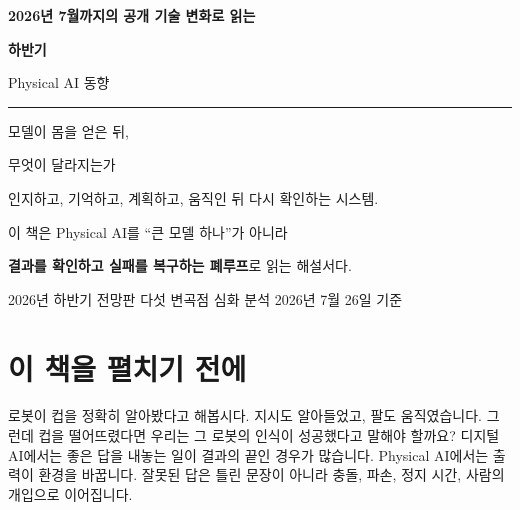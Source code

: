 \documentclass[11pt,openany]{book}
\begin{document}
\frontmatter

\begin{titlepage}
\pagecolor{deepblue}\color{white}
\thispagestyle{empty}
\vspace*{14mm}

{\sffamily\bfseries\fontsize{15}{18}\selectfont
2026년 7월까지의 공개 기술 변화로 읽는\par}
\vspace{11mm}

{\sffamily\bfseries\fontsize{32}{40} 하반기\par
Physical AI 동향\par}

\vspace{8mm}
{\color{coral}\rule{45mm}{2.5pt}}\par
\vspace{8mm}

{\sffamily\fontsize{17}{25}\selectfont
모델이 몸을 얻은 뒤,\par
무엇이 달라지는가\par}

\vfill

\begin{minipage}{0.82\textwidth}
\color{white!84}
\large
인지하고, 기억하고, 계획하고, 움직인 뒤 다시 확인하는 시스템.\par
이 책은 Physical AI를 ``큰 모델 하나''가 아니라\par
\textbf{결과를 확인하고 실패를 복구하는 폐루프}로 읽는 해설서다.
\end{minipage}

\vspace{18mm}
{\sffamily\small 2026년 하반기 전망판 \quad\textbullet\quad 다섯 변곡점 심화 분석 \quad\textbullet\quad 2026년 7월 26일 기준}
\end{titlepage}

\pagecolor{paper}\color{ink}
\cleardoublepage

\chapter*{이 책을 펼치기 전에}

로봇이 컵을 정확히 알아봤다고 해봅시다. 지시도 알아들었고, 팔도 움직였습니다. 그런데 컵을 떨어뜨렸다면 우리는 그 로봇의 인식이 성공했다고 말해야 할까요? 디지털 AI에서는 좋은 답을 내놓는 일이 결과의 끝인 경우가 많습니다. Physical AI에서는 출력이 환경을 바꿉니다. 잘못된 답은 틀린 문장이 아니라 충돌, 파손, 정지 시간, 사람의 개입으로 이어집니다.
\end{document}
